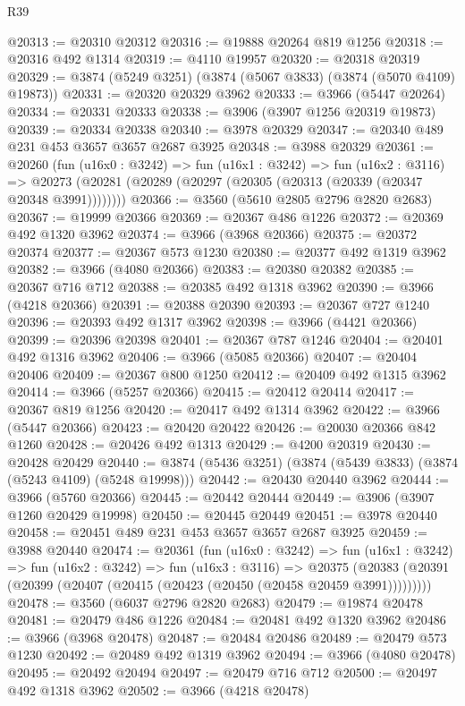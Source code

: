\begin{lexlean}{R39}
\begin{coremodule}
@20313 := @20310 @20312
@20316 := @19888 @20264 @819 @1256
@20318 := @20316 @492 @1314
@20319 := @4110 @19957
@20320 := @20318 @20319
@20329 := @3874 (@5249 @3251) (@3874 (@5067 @3833) (@3874 (@5070 @4109) @19873))
@20331 := @20320 @20329 @3962
@20333 := @3966 (@5447 @20264)
@20334 := @20331 @20333
@20338 := @3906 (@3907 @1256 @20319 @19873)
@20339 := @20334 @20338
@20340 := @3978 @20329
@20347 := @20340 @489 @231 @453 @3657 @3657 @2687 @3925
@20348 := @3988 @20329
@20361 := @20260
    (fun (u16x0 : @3242) =>
    fun (u16x1 : @3242) =>
    fun (u16x2 : @3116) =>
    @20273 (@20281 (@20289 (@20297 (@20305 (@20313 (@20339 (@20347 @20348 @3991))))))))
@20366 := @3560 (@5610 @2805 @2796 @2820 @2683)
@20367 := @19999 @20366
@20369 := @20367 @486 @1226
@20372 := @20369 @492 @1320 @3962
@20374 := @3966 (@3968 @20366)
@20375 := @20372 @20374
@20377 := @20367 @573 @1230
@20380 := @20377 @492 @1319 @3962
@20382 := @3966 (@4080 @20366)
@20383 := @20380 @20382
@20385 := @20367 @716 @712
@20388 := @20385 @492 @1318 @3962
@20390 := @3966 (@4218 @20366)
@20391 := @20388 @20390
@20393 := @20367 @727 @1240
@20396 := @20393 @492 @1317 @3962
@20398 := @3966 (@4421 @20366)
@20399 := @20396 @20398
@20401 := @20367 @787 @1246
@20404 := @20401 @492 @1316 @3962
@20406 := @3966 (@5085 @20366)
@20407 := @20404 @20406
@20409 := @20367 @800 @1250
@20412 := @20409 @492 @1315 @3962
@20414 := @3966 (@5257 @20366)
@20415 := @20412 @20414
@20417 := @20367 @819 @1256
@20420 := @20417 @492 @1314 @3962
@20422 := @3966 (@5447 @20366)
@20423 := @20420 @20422
@20426 := @20030 @20366 @842 @1260
@20428 := @20426 @492 @1313
@20429 := @4200 @20319
@20430 := @20428 @20429
@20440 := @3874 (@5436 @3251) (@3874 (@5439 @3833) (@3874 (@5243 @4109) (@5248 @19998)))
@20442 := @20430 @20440 @3962
@20444 := @3966 (@5760 @20366)
@20445 := @20442 @20444
@20449 := @3906 (@3907 @1260 @20429 @19998)
@20450 := @20445 @20449
@20451 := @3978 @20440
@20458 := @20451 @489 @231 @453 @3657 @3657 @2687 @3925
@20459 := @3988 @20440
@20474 := @20361
    (fun (u16x0 : @3242) =>
    fun (u16x1 : @3242) =>
    fun (u16x2 : @3242) =>
    fun (u16x3 : @3116) =>
    @20375 (@20383 (@20391 (@20399 (@20407 (@20415 (@20423 (@20450 (@20458 @20459 @3991)))))))))
@20478 := @3560 (@6037 @2796 @2820 @2683)
@20479 := @19874 @20478
@20481 := @20479 @486 @1226
@20484 := @20481 @492 @1320 @3962
@20486 := @3966 (@3968 @20478)
@20487 := @20484 @20486
@20489 := @20479 @573 @1230
@20492 := @20489 @492 @1319 @3962
@20494 := @3966 (@4080 @20478)
@20495 := @20492 @20494
@20497 := @20479 @716 @712
@20500 := @20497 @492 @1318 @3962
@20502 := @3966 (@4218 @20478)

\end{coremodule}
\end{lexlean}
